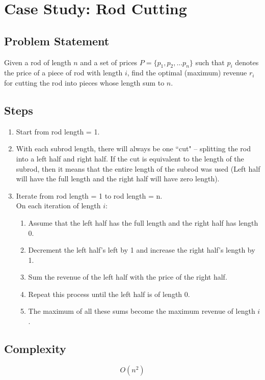 \section{Case Study: Rod Cutting}

\subsection*{Problem Statement}
Given a rod of length $n$ and a set of prices $P = \{ p_1, p_2, ... p_n \}$ such that $p_i$ denotes the price of a piece of rod with length $i$, find the optimal (maximum)  revenue $r_i$ for cutting the rod into pieces whose length sum to $n$.

\subsection*{Steps}
\begin{enumerate}
	\item Start from rod length = 1.
	\item With each subrod length, there will always be one ``cut" -- splitting the rod into a left half and right half. If the cut is equivalent to the length of the subrod, then it means that the entire length of the subrod was used (Left half will have the full length and the right half will have zero length). 
	\item Iterate from rod length = 1 to rod length = n.\\
		On each iteration of length $i$:
	\begin{enumerate}
		\item Assume that the left half has the full length and the right half has length 0.
		\item Decrement the left half's left by 1 and increase the right half's length by 1.
		\item Sum the revenue of the left half with the price of the right half.
		\item Repeat this process until the left half is of length 0.
		\item The maximum of all these sums become the maximum revenue of length $i$.
	\end{enumerate}
\end{enumerate}

\subsection*{Complexity}
$$
O(n^2)
$$

\newpage

